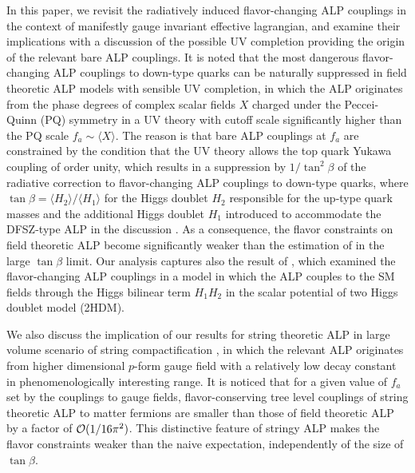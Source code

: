 \documentclass[preprint,prd,aps,tighten,nofootinbib,amssymb]{revtex4}
\begin{document}
In this paper, we revisit the radiatively induced flavor-changing  ALP couplings in the context of manifestly gauge invariant  effective lagrangian, and examine their implications with a discussion of the possible UV completion providing the origin of the relevant bare ALP couplings.
It is noted that the most dangerous flavor-changing ALP couplings to down-type quarks can be naturally suppressed in field theoretic ALP models with sensible UV completion, in which the ALP originates from the phase degrees of complex scalar fields $X$ charged under the Peccei-Quinn (PQ) symmetry in a UV theory with  cutoff scale significantly higher than the PQ scale $f_a\sim \langle X\rangle$.
The reason is that  bare ALP couplings at $f_a$ are constrained by the condition that the UV theory allows the top quark Yukawa coupling of order unity, which results in a suppression by $1/\tan^2\beta$ of the radiative correction to flavor-changing ALP couplings to down-type quarks, where $\tan\beta =\langle H_2\rangle/\langle H_1\rangle$ for the Higgs doublet $H_2$ responsible for the up-type quark masses and the additional Higgs doublet $H_1$ introduced to accommodate the DFSZ-type ALP in the discussion \cite{Kim:2008hd}.
As a consequence, the flavor constraints on field theoretic ALP  become significantly weaker than the estimation of  \cite{Batell:2009jf, Dolan:2014ska} in the large $\tan\beta$ limit.
Our analysis captures also the result of \cite{Freytsis:2009ct}, which examined the flavor-changing ALP couplings in a model in which the ALP couples to the SM fields through the Higgs bilinear term $H_1H_2$ in the scalar potential of two Higgs doublet model (2HDM).  

We also discuss the  implication of our results for string theoretic  ALP in large volume scenario of string compactification  \cite{Balasubramanian:2005zx}, in which the relevant ALP originates from higher dimensional  $p$-form gauge field with a relatively low  decay constant in phenomenologically interesting range. 
It is noticed that for a given value of $f_a$ set by the couplings to gauge fields,  flavor-conserving tree level couplings of string theoretic ALP to matter fermions are smaller than those of field theoretic ALP by a factor of ${\cal O}(1/16\pi^2)$.
This distinctive feature of stringy ALP  makes the flavor constraints  weaker than the naive expectation, independently of the size of $\tan\beta$.
\end{document}
